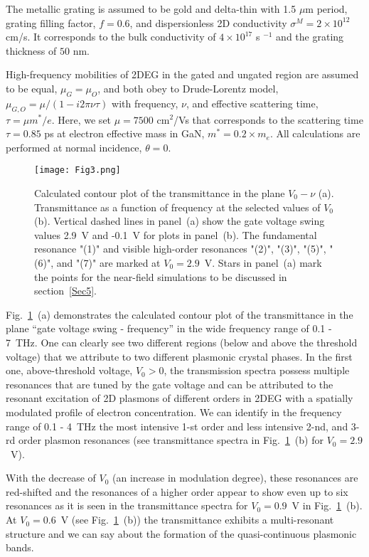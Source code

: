 \documentclass[%
 reprint,
 amsmath,amssymb,
 aps,
]{revtex4-2}
\begin{document}
The metallic grating is assumed to be gold and delta-thin with 1.5 $\mu$m period, grating filling factor, $f=0.6$, and dispersionless 2D conductivity $\sigma^{M} = 2\times10^{12}$ cm/s. It corresponds to the bulk conductivity of $4\times10^{17}$ s $^{-1}$ and the grating thickness of $50$ nm.

High-frequency mobilities of 2DEG in the gated and ungated region are assumed to be equal, $\mu_G = \mu_O$, and both obey to Drude-Lorentz model, $\mu_{G,O} = \mu/(1 - i 2\pi\nu\tau)$  with frequency, $\nu$, and effective scattering time, $\tau=\mu m^*/e$. Here, we set $\mu = 7500$ cm$^2$/Vs that corresponds to the scattering time $\tau = 0.85$ ps at electron effective mass in GaN, $m^* = 0.2\times m_e$.
All calculations are performed at normal incidence, $\theta=0$.

\begin{figure}[t!]
\texttt{[image: Fig3.png]}
\caption{Calculated contour plot of the transmittance in the plane ${V_0-\nu}$ (a). 
Transmittance as a function of frequency at the selected values of  $V_0$ (b). 
Vertical dashed lines in panel~(a) show the gate voltage swing values 2.9~V and -0.1~V for plots in panel~(b).
The fundamental resonance "(1)" and visible high-order resonances "(2)", "(3)", "(5)", "(6)", and "(7)" are marked at $V_0 = 2.9$~V.
Stars in panel~(a) mark the points for the near-field simulations to be discussed in section~\ref{Sec5}.}
\label{Fig3}
\end{figure}

Fig.~\ref{Fig3}~(a) demonstrates the calculated contour plot of the transmittance in the plane “gate voltage swing - frequency” in the wide frequency range of 0.1 - 7~THz. One can clearly see two different regions (below and above the threshold voltage) that we attribute to two different plasmonic crystal phases. In the first one, above-threshold voltage, $V_0 > 0$, the transmission spectra possess multiple resonances that are tuned by the gate voltage and can be attributed to the resonant excitation of 2D plasmons of different orders in 2DEG with a spatially modulated profile of electron concentration. We can identify in the frequency range of 0.1 - 4~THz the most intensive 1-st order and less intensive 2-nd, and 3-rd order plasmon resonances (see transmittance spectra in Fig.~\ref{Fig3}~(b) for $V_0 = 2.9$~V). 

With the decrease of $V_0$ (an increase in modulation degree), these resonances are red-shifted and the resonances of a higher order appear to show even up to six resonances as it is seen in the transmittance spectra for $V_0 = 0.9$~V in Fig.~\ref{Fig3}~(b). At $V_0 = 0.6$~V (see Fig.~\ref{Fig3}~(b))  the transmittance exhibits a multi-resonant structure and we can say about the formation of the quasi-continuous plasmonic bands.  
\end{document}
